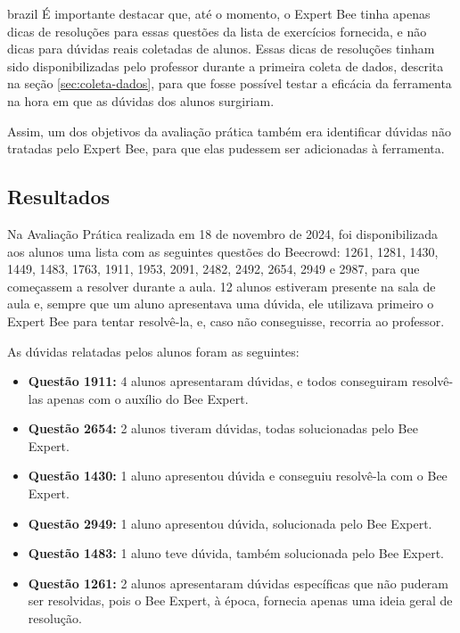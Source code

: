 \begin{otherlanguage*}{brazil}
É importante destacar que, até o momento, o Expert Bee tinha apenas dicas de resoluções para essas questões da lista de exercícios fornecida, e não dicas para dúvidas reais coletadas de alunos. Essas dicas de resoluções tinham sido disponibilizadas pelo professor durante a primeira coleta de dados, descrita na seção \ref{sec:coleta-dados}, para que fosse possível testar a eficácia da ferramenta na hora em que as dúvidas dos alunos surgiriam. 

Assim, um dos objetivos da avaliação prática também era identificar dúvidas não tratadas pelo Expert Bee, para que elas pudessem ser adicionadas à ferramenta.

\subsection{Resultados}  

Na Avaliação Prática realizada em 18 de novembro de 2024, foi disponibilizada aos alunos uma lista com as seguintes questões do Beecrowd: 1261, 1281, 1430, 1449, 1483, 1763, 1911, 1953, 2091, 2482, 2492, 2654, 2949 e 2987, para que começassem a resolver durante a aula. 12 alunos estiveram presente na sala de aula e, sempre que um aluno apresentava uma dúvida, ele utilizava primeiro o Expert Bee para tentar resolvê-la, e, caso não conseguisse, recorria ao professor. 

As dúvidas relatadas pelos alunos foram as seguintes:  

\begin{itemize}  
    \item \textbf{Questão 1911:} 4 alunos apresentaram dúvidas, e todos conseguiram resolvê-las apenas com o auxílio do Bee Expert.  
    \item \textbf{Questão 2654:} 2 alunos tiveram dúvidas, todas solucionadas pelo Bee Expert.  
    \item \textbf{Questão 1430:} 1 aluno apresentou dúvida e conseguiu resolvê-la com o Bee Expert.  
    \item \textbf{Questão 2949:} 1 aluno apresentou dúvida, solucionada pelo Bee Expert.  
    \item \textbf{Questão 1483:} 1 aluno teve dúvida, também solucionada pelo Bee Expert.  
    \item \textbf{Questão 1261:} 2 alunos apresentaram dúvidas específicas que não puderam ser resolvidas, pois o Bee Expert, à época, fornecia apenas uma ideia geral de resolução.  
\end{itemize}  


\end{otherlanguage*}
